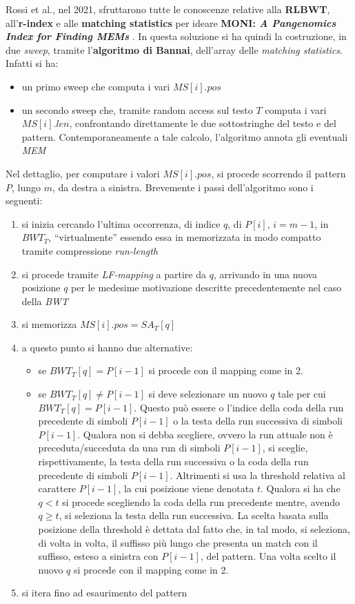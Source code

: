 Rossi et al., nel 2021, sfruttarono tutte le conoscenze relative
alla \textbf{RLBWT}, all'\textbf{r-index} e alle \textbf{matching statistics}
per ideare \textbf{MONI:\textit{ A Pangenomics Index for Finding MEMs}}
\cite{moni}. In questa soluzione si ha quindi la costruzione, in due
\textit{sweep}, tramite l'\textbf{algoritmo di Bannai}, dell'array delle
\textit{matching statistics}. Infatti si ha:
\begin{itemize}
  \item un primo sweep che computa i vari $MS[i].pos$
  \item un secondo sweep che, tramite random access sul testo $T$ computa i
  vari $MS[i].len$, confrontando direttamente le due sottostringhe del testo e
  del pattern. Contemporaneamente a tale calcolo, l'algoritmo annota gli
  eventuali \textit{MEM}
\end{itemize}
Nel dettaglio, per computare i valori $MS[i].pos$, si procede scorrendo il
pattern $P$, lungo $m$, da destra a sinistra. Brevemente i passi dell'algoritmo
sono i seguenti: 
\begin{enumerate}
  \item si inizia cercando l'ultima occorrenza, di indice $q$, di $P[i]$,
  $i=m-1$, in $BWT_T$, ``virtualmente'' essendo essa in memorizzata in modo
  compatto tramite compressione \textit{run-length}
  \item si procede tramite \textit{LF-mapping} a partire da $q$, arrivando in
  una nuova posizione $q$ per le medesime motivazione descritte precedentemente
  nel caso della \textit{BWT}
  \item si memorizza $MS[i].pos = SA_T[q]$
  \item a questo punto si hanno due alternative:
  \begin{itemize}
    \item se $BWT_T[q]=P[i-1]$ si procede con il mapping come in 2.
    \item se $BWT_T[q]\neq P[i-1]$ si deve selezionare un nuovo $q$ tale per cui
    $BWT_T[q]=P[i-1]$. Questo può essere o l'indice della coda della run
    precedente di simboli $P[i-1]$ o la testa della run successiva di simboli
    $P[i-1]$. Qualora non si debba scegliere, ovvero la run attuale non è
    preceduta/succeduta da una run di simboli $P[i-1]$, si sceglie,
    rispettivamente, la testa della run successiva o la coda della run
    precedente di simboli $P[i-1]$. Altrimenti si usa la threshold relativa al
    carattere $P[i-1]$, la cui posizione viene denotata $t$. Qualora si ha che
    $q<t$ si procede scegliendo la coda della run precedente mentre, avendo
    $q\geq t$, si seleziona la testa della run successiva. La scelta basata
    sulla posizione della threshold è dettata dal fatto che, in tal modo, si
    seleziona, di volta in volta, il suffisso più lungo che presenta un match
    con il suffisso, esteso a sinistra con $P[i-1]$, del pattern. Una volta
    scelto il nuovo $q$ si procede con il mapping come in 2.
  \end{itemize}
  \item si itera fino ad esaurimento del pattern
\end{enumerate}
